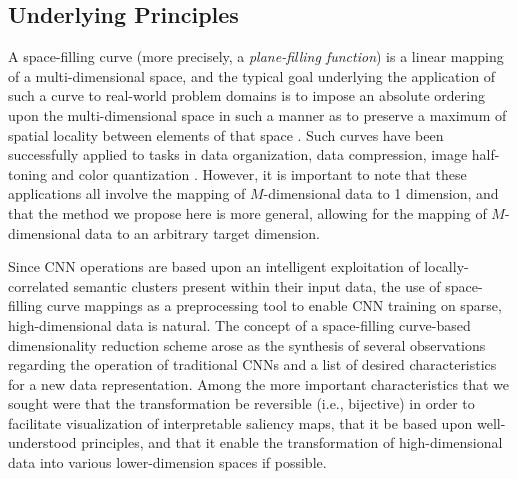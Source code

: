 \documentclass{article}
\begin{document}
\subsection{Underlying Principles}

A space-filling curve (more precisely, a \textit{plane-filling function}) is a linear mapping of a multi-dimensional space, and the typical goal underlying the application of such a curve to real-world problem domains is to impose an absolute ordering upon the multi-dimensional space in such a manner as to preserve a maximum of spatial locality between elements of that space \cite{moon01}. Such curves have been successfully applied to tasks in data organization, data compression, image half-toning and color quantization \cite{lindenbaum96}. However, it is important to note that these applications all involve the mapping of $M$-dimensional data to 1 dimension, and that the method we propose here is more general, allowing for the mapping of $M$-dimensional data to an arbitrary target dimension. 

Since CNN operations are based upon an intelligent exploitation of locally-correlated semantic clusters present within their input data, the use of space-filling curve mappings as a preprocessing tool to enable CNN training on sparse, high-dimensional data is natural. The concept of a space-filling curve-based dimensionality reduction scheme arose as the synthesis of several observations regarding the operation of traditional CNNs and a list of desired characteristics for a new data representation. Among the more important characteristics that we sought were that the transformation be reversible (i.e., bijective) in order to facilitate visualization of interpretable saliency maps, that it be based upon well-understood principles, and that it enable the transformation of high-dimensional data into various lower-dimension spaces if possible. 
\end{document}
